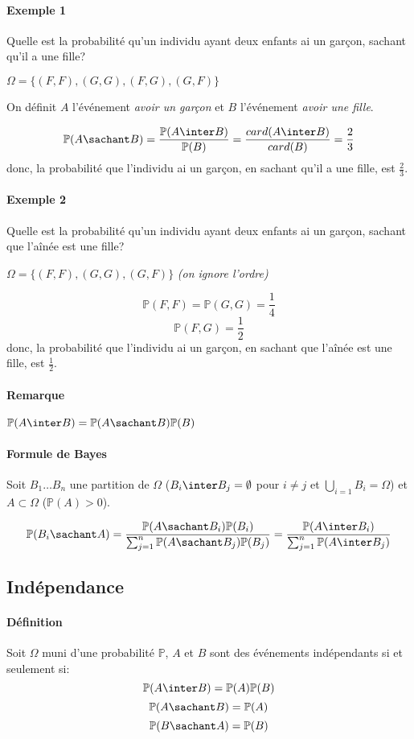 \documentclass[a4paper,10pt,french,openany]{memoir}
\newcommand{\Proba}{\mathbb{P}}
\begin{document}
\paragraph{Exemple 1}
Quelle est la probabilité qu'un individu ayant deux enfants ai un garçon, sachant qu'il a une fille?

$\Omega = \lbrace (F,F), (G,G), (F,G), (G,F) \rbrace$

On définit $A$ l'événement \emph{avoir un garçon} et $B$ l'événement \emph{avoir une fille}.

\[ \Proba(A \sachant B) = \frac{\Proba(A \inter B)}{\Proba(B)} = \frac{card(A \inter B)}{card(B)} = \frac{2}{3} \]
donc, la probabilité que l'individu ai un garçon, en sachant qu'il a une fille, est $\frac 2 3$.

\paragraph{Exemple 2}
Quelle est la probabilité qu'un individu ayant deux enfants ai un garçon, sachant que l'aînée est une fille?

$\Omega = \lbrace (F,F), (G,G), (G,F) \rbrace$ \textit{(on ignore l'ordre)}

\[ \Proba(F,F)=\Proba(G,G)=\frac 1 4 \]
\[ \Proba(F,G)=\frac 1 2 \]
donc, la probabilité que l'individu ai un garçon, en sachant que l'aînée est une fille, est $\frac 1 2$.

\paragraph{Remarque}
$\Proba(A \inter B) = \Proba(A \sachant B) \Proba(B)$

\paragraph{Formule de Bayes}
Soit $B_1 \dots B_n$ une partition de $\Omega$ ($B_i \inter B_j = \emptyset$ pour $i \neq j$ et $\bigcup_{i=1} B_i = \Omega$) et $A \subset \Omega$ ($\Proba(A) > 0$).

\[
\Proba(B_i \sachant A) = \frac{\Proba(A \sachant B_i) \Proba(B_i)}{\sum_{j=1}^n \Proba(A \sachant B_j) \Proba(B_j)} = \frac{\Proba(A \inter B_i)}{\sum_{j=1}^n \Proba(A \inter B_j)}
\]

\subsection{Indépendance}

\paragraph{Définition}
Soit $\Omega$ muni d'une probabilité $\Proba$, $A$ et $B$ sont des événements indépendants si et seulement si:
\[\Proba(A \inter B) = \Proba(A) \Proba(B)\]
\[\Proba(A \sachant B) = \Proba(A)\]
\[\Proba(B \sachant A) = \Proba(B)\]
\end{document}
